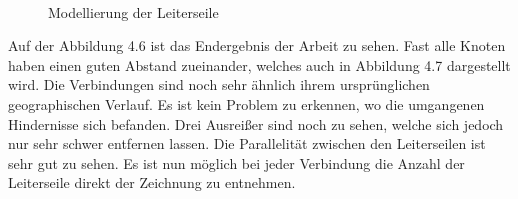 \begin{figure}[t]
	\centering
	\hspace{1.0cm}%
	\\
	\caption[Vergleich der Leiterseile]{Modellierung der Leiterseile}
	\label{fig_testbild2}
\end{figure}


Auf der Abbildung 4.6 ist das Endergebnis  der Arbeit zu sehen. Fast alle Knoten haben einen guten Abstand zueinander, welches auch in Abbildung 4.7 dargestellt wird.  Die Verbindungen sind noch sehr ähnlich ihrem ursprünglichen geographischen Verlauf. Es ist kein Problem zu erkennen, wo die umgangenen Hindernisse sich befanden. Drei Ausreißer sind noch zu sehen, welche sich jedoch nur sehr schwer entfernen lassen. Die Parallelität zwischen den Leiterseilen ist sehr gut zu sehen. Es ist nun möglich bei jeder Verbindung die Anzahl der Leiterseile direkt der Zeichnung zu entnehmen.

